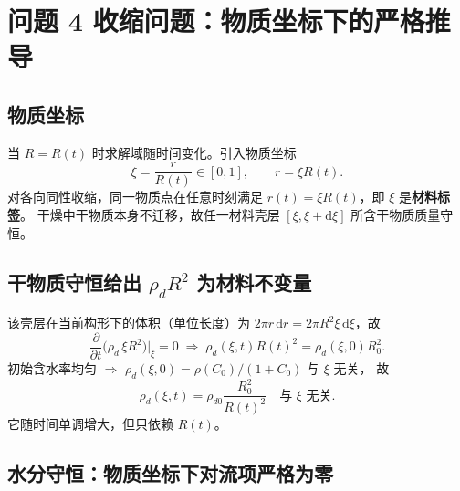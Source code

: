 \documentclass[11pt,a4paper]{article}
\theoremstyle{definition}
\begin{document}
\section{问题 4 收缩问题：物质坐标下的严格推导}
\label{sec:shrink}

\subsection{物质坐标}

当 $R=R(t)$ 时求解域随时间变化。引入物质坐标
\begin{equation}
\xi=\frac{r}{R(t)}\in[0,1],
\qquad r=\xi R(t).
\end{equation}
对各向同性收缩，同一物质点在任意时刻满足 $r(t)=\xi R(t)$，即 $\xi$ 是\textbf{材料标签}。
干燥中干物质本身不迁移，故任一材料壳层 $[\xi,\xi+\mathrm{d}\xi]$ 所含干物质质量守恒。

\subsection{干物质守恒给出 $\rho_dR^2$ 为材料不变量}

该壳层在当前构形下的体积（单位长度）为 $2\pi r\,\mathrm{d}r=2\pi R^2\xi\,\mathrm{d}\xi$，故
\[
\frac{\partial}{\partial t}\Big(\rho_d\,\xi R^2\Big)\Big|_\xi=0
\;\Longrightarrow\;
\rho_d(\xi,t)R(t)^2=\rho_d(\xi,0)R_0^2 .
\]
初始含水率均匀 $\Rightarrow$ $\rho_d(\xi,0)=\rho(C_0)/(1+C_0)$ 与 $\xi$ 无关，
故
\begin{equation}
\rho_d(\xi,t)=\rho_{d0}\frac{R_0^2}{R(t)^2}
\quad\text{与 }\xi\text{ 无关}.
\label{eq:rhod}
\end{equation}
它随时间单调增大，但只依赖 $R(t)$。

\subsection{水分守恒：物质坐标下对流项严格为零}
\end{document}
